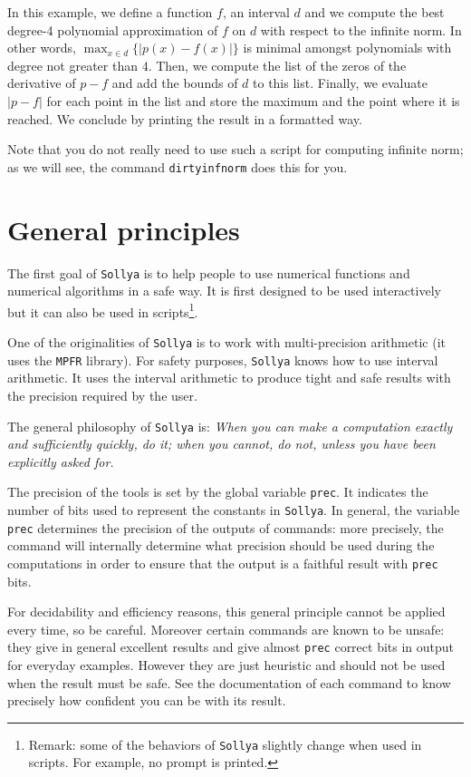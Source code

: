 \documentclass[a4paper]{article}
\newcommand{\com}[1]{\texttt{#1}}
\newcommand{\key}[1]{\texttt{#1}}
\newcommand{\sollya}{\texttt{Sollya}\xspace}
\begin{document}
In this example, we define a function $f$, an interval $d$ and we compute the best degree-4 polynomial approximation of $f$ on $d$ with respect to the infinite norm. In other words, $\max_{x \in d} \{|p(x)-f(x)|\}$ is minimal amongst polynomials with degree not greater than $4$. Then, we compute the list of the zeros of the derivative of $p-f$ and add the bounds of $d$ to this list. Finally, we evaluate $|p-f|$ for each point in the list and store the maximum and the point where it is reached. We conclude by printing the result in a formatted way.

Note that you do not really need to use such a script for computing infinite norm; as we will see, the command \com{dirtyinfnorm} does this for you.

\section{General principles}
The first goal of \sollya is to help people to use numerical functions and numerical algorithms in a safe way. It is first designed to be used interactively but it can also be used in scripts\footnote{Remark: some of the behaviors of \sollya slightly change when used in scripts. For example, no prompt is printed.}.

One of the originalities of \sollya is to work with multi-precision arithmetic (it uses the \texttt{MPFR} library). For safety purposes, \sollya knows how to use interval arithmetic. It uses the interval arithmetic to produce tight and safe results with the precision required by the user.

The general philosophy of \sollya is: \emph{When you can make a computation exactly and sufficiently quickly, do it; when you cannot, do not, unless you have been explicitly asked for.}

The precision of the tools is set by the global variable \key{prec}. It indicates the number of bits used to represent the constants in \sollya. In general, the variable \key{prec} determines the precision of the outputs of commands: more precisely, the command will internally determine what precision should be used during the computations in order to ensure that the output is a faithful result with \key{prec} bits.

For decidability and efficiency reasons, this general principle cannot be applied every time, so be careful. Moreover certain commands are known to be unsafe: they give in general excellent results and give almost \key{prec} correct bits in output for everyday examples. However they are just heuristic and should not be used when the result must be safe. See the documentation of each command to know precisely how confident you can be with its result.
\end{document}
